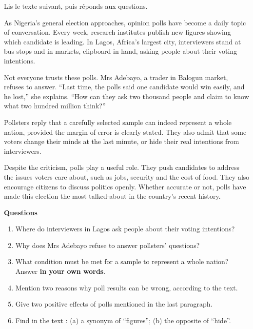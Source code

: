 \documentclass[11pt]{article}
\newcounter{popsec}
\newcounter{popsub}
\newcommand{\courssub}[1]{%
  \stepcounter{popsub}%
  \par\vspace{9pt}\noindent{\popxbold\fontsize{11.5}{13}\selectfont\color{popink}{\color{poporange}\thepopsec.\thepopsub}\hspace{6pt}#1}\par\nopagebreak\vspace{4pt}
}
\begin{document}
\courssub{Je me prépare au Bac}

\begin{exercice}
Lis le texte suivant, puis réponds aux questions.

\begin{textebox}
As Nigeria's general election approaches, opinion polls have become a daily topic of conversation. Every week, research institutes publish new figures showing which candidate is leading. In Lagos, Africa's largest city, interviewers stand at bus stops and in markets, clipboard in hand, asking people about their voting intentions.

Not everyone trusts these polls. Mrs Adebayo, a trader in Balogun market, refuses to answer. “Last time, the polls said one candidate would win easily, and he lost,” she explains. “How can they ask two thousand people and claim to know what two hundred million think?”

Pollsters reply that a carefully selected sample can indeed represent a whole nation, provided the margin of error is clearly stated. They also admit that some voters change their minds at the last minute, or hide their real intentions from interviewers.

Despite the criticism, polls play a useful role. They push candidates to address the issues voters care about, such as jobs, security and the cost of food. They also encourage citizens to discuss politics openly. Whether accurate or not, polls have made this election the most talked-about in the country's recent history.
\end{textebox}

\textbf{Questions}
\begin{enumerate}
\item Where do interviewers in Lagos ask people about their voting intentions?
\item Why does Mrs Adebayo refuse to answer pollsters' questions?
\item What condition must be met for a sample to represent a whole nation? Answer \textbf{in your own words}.
\item Mention two reasons why poll results can be wrong, according to the text.
\item Give two positive effects of polls mentioned in the last paragraph.
\item Find in the text : (a) a synonym of “figures”; (b) the opposite of “hide”.
\end{enumerate}
\end{exercice}
\end{document}
